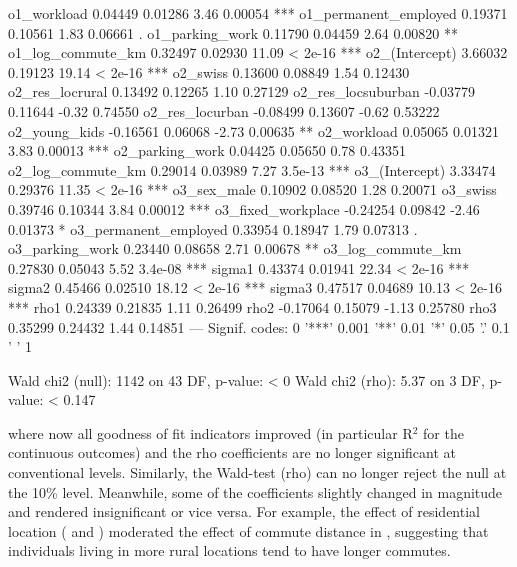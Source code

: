 \documentclass[%
    twoside, openright, titlepage, numbers=noenddot,%
    cleardoublepage=empty,%
    abstract=false,%
    BCOR=5.5mm, paper=a5, fontsize=10pt,%
]{scrreprt}
\begin{document}
\begin{Schunk}
\begin{Soutput}
o1_workload             0.04449    0.01286    3.46 0.00054 ***
o1_permanent_employed   0.19371    0.10561    1.83 0.06661 .  
o1_parking_work         0.11790    0.04459    2.64 0.00820 ** 
o1_log_commute_km       0.32497    0.02930   11.09 < 2e-16 ***
o2_(Intercept)          3.66032    0.19123   19.14 < 2e-16 ***
o2_swiss                0.13600    0.08849    1.54 0.12430    
o2_res_locrural         0.13492    0.12265    1.10 0.27129    
o2_res_locsuburban     -0.03779    0.11644   -0.32 0.74550    
o2_res_locurban        -0.08499    0.13607   -0.62 0.53222    
o2_young_kids          -0.16561    0.06068   -2.73 0.00635 ** 
o2_workload             0.05065    0.01321    3.83 0.00013 ***
o2_parking_work         0.04425    0.05650    0.78 0.43351    
o2_log_commute_km       0.29014    0.03989    7.27 3.5e-13 ***
o3_(Intercept)          3.33474    0.29376   11.35 < 2e-16 ***
o3_sex_male             0.10902    0.08520    1.28 0.20071    
o3_swiss                0.39746    0.10344    3.84 0.00012 ***
o3_fixed_workplace     -0.24254    0.09842   -2.46 0.01373 *  
o3_permanent_employed   0.33954    0.18947    1.79 0.07313 .  
o3_parking_work         0.23440    0.08658    2.71 0.00678 ** 
o3_log_commute_km       0.27830    0.05043    5.52 3.4e-08 ***
sigma1                  0.43374    0.01941   22.34 < 2e-16 ***
sigma2                  0.45466    0.02510   18.12 < 2e-16 ***
sigma3                  0.47517    0.04689   10.13 < 2e-16 ***
rho1                    0.24339    0.21835    1.11 0.26499    
rho2                   -0.17064    0.15079   -1.13 0.25780    
rho3                    0.35299    0.24432    1.44 0.14851    
---
Signif. codes:  0 '***' 0.001 '**' 0.01 '*' 0.05 '.' 0.1 ' ' 1

Wald chi2 (null): 1142 on 43 DF, p-value: < 0
Wald chi2 (rho): 5.37 on 3 DF, p-value: < 0.147
\end{Soutput}
\end{Schunk}
%
where now all goodness of fit indicators improved (in particular R$^2$ for the continuous outcomes) and the rho coefficients are no longer significant at conventional levels. Similarly, the Wald-test (rho) can no longer reject the null at the 10\% level. Meanwhile, some of the coefficients slightly changed in magnitude and rendered insignificant or vice versa. For example, the effect of residential location ( and ) moderated the effect of commute distance in , suggesting that individuals living in more rural locations tend to have longer commutes.
\end{document}
